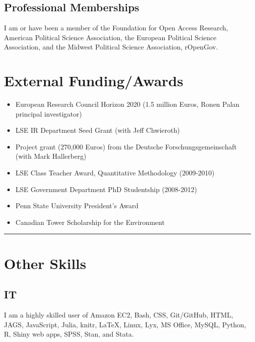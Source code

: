 \documentclass[a4paper]{article}
\begin{document}
{\subsection*{Professional Memberships}

I am or have been a member of the Foundation for Open Access Research, American Political Science Association, the European Political Science Association, and the Midwest Political Science Association, rOpenGov.

\section*{External Funding/Awards}

\begin{itemize}

    \item European Research Council Horizon 2020 (1.5 million Euros, Ronen Palan principal investigator)
    \item LSE IR Department Seed Grant (with Jeff Chwieroth)
    \item Project grant (270,000 Euros) from the Deutsche Forschungsgemeinschaft (with Mark Hallerberg)
    \item LSE Class Teacher Award, Quantitative Methodology (2009-2010)
    \item LSE Government Department PhD Studentship (2008-2012)
    \item Penn State University President's Award
    \item Canadian Tower Scholarship for the Environment

\end{itemize}

\vspace{0.5cm}
\medskip\hrule height 1pt
\vspace{0.5cm}

\section*{Other Skills}

\subsection*{IT}

I am a highly skilled user of Amazon EC2, Bash, CSS, Git/GitHub, HTML, JAGS, JavaScript, Julia, knitr, LaTeX, Linux, Lyx, MS Office, MySQL, Python, R, Shiny web apps, SPSS, Stan, and Stata.

}
\end{document}

